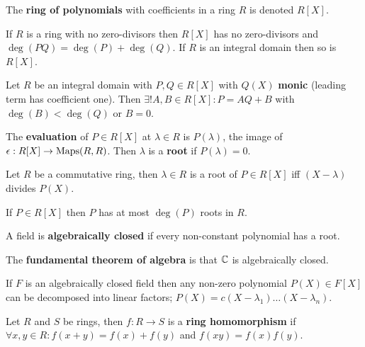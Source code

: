 \begin{multicols}{2}
\begin{definition}
The \textbf{ring of polynomials} with coefficients in a ring $R$ is denoted $R[X]$.
\end{definition}

\begin{theorem}[3.3.3]
If $R$ is a ring with no zero-divisors then $R[X]$ has no zero-divisors and $\deg(PQ)=\deg(P)+\deg(Q)$. If $R$ is an integral domain then so is $R[X]$.
\end{theorem}

\begin{theorem}[3.3.4]
Let $R$ be an integral domain with $P,Q\in R[X]$ with $Q(X)$ \textbf{monic} (leading term has coefficient one). Then $\exists! A,B\in R[X]: P=AQ+B$ with $\deg(B)<\deg(Q)$ or $B=0$.
\end{theorem}

\begin{definition}
The \textbf{evaluation} of $P\in R[X]$ at $\lambda\in R$ is $P(\lambda)$, the image of $\epsilon:R[X]\to\mathrm{Maps}(R,R)$. Then $\lambda$ is a \textbf{root} if $P(\lambda)=0$.
\end{definition}

\begin{theorem}[3.3.9]
Let $R$ be a commutative ring, then $\lambda\in R$ is a root of $P\in R[X]$ iff $(X-\lambda)$ divides $P(X)$.
\end{theorem}

\begin{theorem}[3.3.10]
If $P\in R[X]$ then $P$ has at most $\deg(P)$ roots in $R$.
\end{theorem}

\begin{definition}
A field is \textbf{algebraically closed} if every non-constant polynomial has a root.
\end{definition}

\begin{theorem}
The \textbf{fundamental theorem of algebra} is that $\mathbb{C}$ is algebraically closed.
\end{theorem}

\begin{theorem}[3.3.14]
If $F$ is an algebraically closed field then any non-zero polynomial $P(X)\in F[X]$ can be decomposed into linear factors; $P(X) = c(X-\lambda_1)\dots(X-\lambda_n)$.
\end{theorem}

\begin{definition}
Let $R$ and $S$ be rings, then $f:R\to S$ is a \textbf{ring homomorphism} if $\forall x,y\in R: f(x+y)=f(x)+f(y)$ and $f(xy)=f(x)f(y)$.
\end{definition}


\end{multicols}

